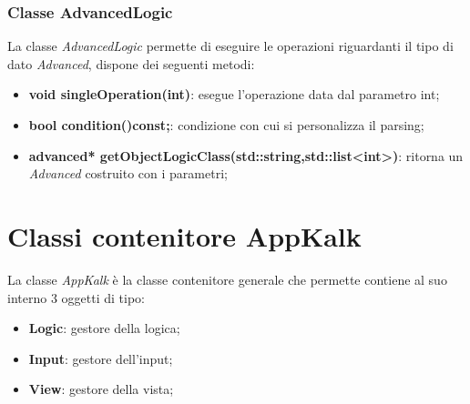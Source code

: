 \documentclass[a4paper,10pt]{article}
\begin{document}
            \subsubsection{Classe AdvancedLogic}
            La classe \textit{AdvancedLogic} permette di eseguire le operazioni riguardanti il tipo di dato \textit{Advanced}, dispone dei seguenti metodi:
            \begin{itemize}
                \item \textbf{void singleOperation(int)}: esegue l'operazione data dal parametro int;
                \item \textbf{bool condition()const;}: condizione con cui si personalizza il parsing;
                \item \textbf{advanced* getObjectLogicClass(std::string,std::list<int>)}: ritorna un \textit{Advanced} costruito con i parametri;
            \end{itemize}
    
            \section{Classi contenitore AppKalk}
            La classe \textit{AppKalk} è la classe contenitore generale che permette contiene al suo interno 3 oggetti di tipo:
            \begin{itemize}
                \item \textbf{Logic}: gestore della logica;
                \item \textbf{Input}: gestore dell'input;
                \item \textbf{View}: gestore della vista;
            \end{itemize}
\end{document}
